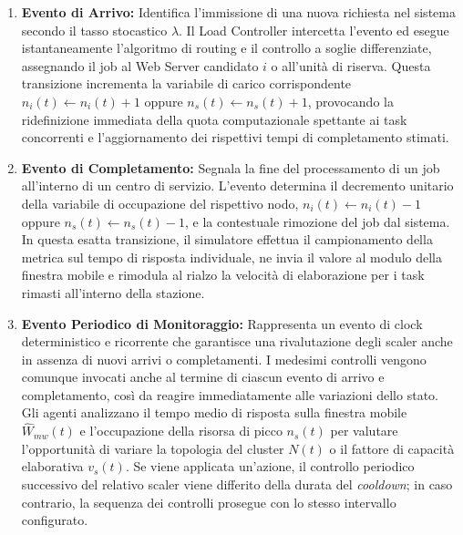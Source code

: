 ﻿\documentclass[a4paper,12pt]{article}
\begin{document}
\begin{enumerate}
    \item \textbf{Evento di Arrivo:} 
    Identifica l'immissione di una nuova richiesta nel sistema secondo il tasso stocastico $\lambda$. Il Load Controller intercetta l'evento ed esegue istantaneamente l'algoritmo di routing e il controllo a soglie differenziate, assegnando il job al Web Server candidato $i$ o all'unità di riserva. Questa transizione incrementa la variabile di carico corrispondente $n_i(t) \leftarrow n_i(t) + 1$ oppure $n_s(t) \leftarrow n_s(t) + 1$, provocando la ridefinizione immediata della quota computazionale spettante ai task concorrenti e l'aggiornamento dei rispettivi tempi di completamento stimati.

    \item \textbf{Evento di Completamento:} 
    Segnala la fine del processamento di un job all'interno di un centro di servizio. L'evento determina il decremento unitario della variabile di occupazione del rispettivo nodo, $n_i(t) \leftarrow n_i(t) - 1$ oppure $n_s(t) \leftarrow n_s(t) - 1$,  e la contestuale rimozione del job dal sistema. In questa esatta transizione, il simulatore effettua il campionamento della metrica sul tempo di risposta individuale, ne invia il valore al modulo della finestra mobile e rimodula al rialzo la velocità di elaborazione per i task rimasti all'interno della stazione.

    \item \textbf{Evento Periodico di Monitoraggio:}
    Rappresenta un evento di clock deterministico e ricorrente che garantisce una rivalutazione degli scaler anche in assenza di nuovi arrivi o completamenti. I medesimi controlli vengono comunque invocati anche al termine di ciascun evento di arrivo e completamento, così da reagire immediatamente alle variazioni dello stato. Gli agenti analizzano il tempo medio di risposta sulla finestra mobile $\hat{W}_{mw}(t)$ e l'occupazione della risorsa di picco $n_s(t)$ per valutare l'opportunità di variare la topologia del cluster $N(t)$ o il fattore di capacità elaborativa $v_s(t)$. Se viene applicata un'azione, il controllo periodico successivo del relativo scaler viene differito della durata del \textit{cooldown}; in caso contrario, la sequenza dei controlli prosegue con lo stesso intervallo configurato.
\end{enumerate}

\clearpage


\end{document}
